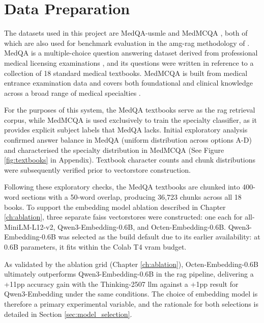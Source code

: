 \chapter{Data Preparation}

The datasets used in this project are MedQA-\gls{usmle} \cite{jin2021} and MedMCQA \cite{pal2022}, both of which are also used for benchmark evaluation in the \gls{amg-rag} methodology of \citet{rezaei2025}. MedQA is a multiple-choice question answering dataset derived from professional medical licensing examinations \cite{jin2021}, and its questions were written in reference to a collection of 18 standard medical textbooks. MedMCQA is built from medical entrance examination data and covers both foundational and clinical knowledge across a broad range of medical specialties \cite{pal2022}. 

For the purposes of this system, the MedQA textbooks serve as the \gls{rag} retrieval corpus, while MedMCQA is used exclusively to train the specialty classifier, as it provides explicit subject labels that MedQA lacks. Initial exploratory analysis confirmed answer balance in MedQA (uniform distribution across options A-D) and characterised the specialty distribution in MedMCQA (See Figure \ref{fig:textbooks} in Appendix). Textbook character counts and chunk distributions were subsequently verified prior to vectorstore construction.

Following these exploratory checks, the MedQA textbooks are chunked into 400-word sections with a 50-word overlap, producing 36,723 chunks across all 18 books. To support the embedding model ablation described in Chapter \ref{ch:ablation}, three separate \gls{faiss} vectorstores were constructed: one each for all-MiniLM-L12-v2, Qwen3-Embedding-0.6B, and Octen-Embedding-0.6B. Qwen3-Embedding-0.6B was selected as the build default due to its earlier availability: at 0.6B parameters, it fits within the Colab T4 \gls{vram} budget. 

As validated by the ablation grid (Chapter \ref{ch:ablation}), Octen-Embedding-0.6B ultimately outperforms Qwen3-Embedding-0.6B in the \gls{rag} pipeline, delivering a +11\gls{pp} accuracy gain with the Thinking-2507 \gls{llm} against a +1\gls{pp} result for Qwen3-Embedding under the same conditions. The choice of embedding model is therefore a primary experimental variable, and the rationale for both selections is detailed in Section \ref{sec:model_selection}.

